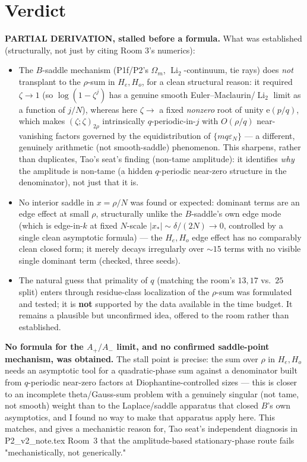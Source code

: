 \documentclass[11pt]{article}
\theoremstyle{remark}\newtheorem{remark}[theorem]{Remark}
\newcommand{\e}{\mathrm{e}}
\begin{document}
\section{Verdict}
\textbf{PARTIAL DERIVATION, stalled before a formula.} What was established (structurally, not just by citing Room 3's numerics):
\begin{itemize}
\item The $B$-saddle mechanism (P1f/P2's $\Omega_m$, $\operatorname{Li}_2$-continuum, tie rays) does \emph{not} transplant to the
$\rho$-sum in $H_e,H_o$, for a clean structural reason: it required $\zeta\to1$ (so $\log(1-\zeta^j)$ has a genuine smooth
Euler--Maclaurin/$\operatorname{Li}_2$ limit as a function of $j/N$), whereas here $\zeta\to$ a fixed \emph{nonzero} root of unity
$\e(p/q)$, which makes $(\zeta;\zeta)_{2\rho}$ intrinsically $q$-periodic-in-$j$ with $O(\rho/q)$ near-vanishing factors governed
by the equidistribution of $\{mq\varepsilon_N\}$ — a different, genuinely arithmetic (not smooth-saddle) phenomenon. This
sharpens, rather than duplicates, Tao's seat's finding (non-tame amplitude): it identifies \emph{why} the amplitude is non-tame
(a hidden $q$-periodic near-zero structure in the denominator), not just that it is.
\item No interior saddle in $x=\rho/N$ was found or expected: dominant terms are an edge effect at small $\rho$, structurally
unlike the $B$-saddle's own edge mode (which is edge-in-$k$ at fixed $N$-scale $|x_*|\sim\delta/(2N)\to0$, controlled by a single
clean asymptotic formula) — the $H_e,H_o$ edge effect has no comparably clean closed form; it merely decays irregularly over
$\sim15$ terms with no visible single dominant term (checked, three seeds).
\item The natural guess that primality of $q$ (matching the room's $13,17$ vs.\ $25$ split) enters through residue-class
localization of the $\rho$-sum was formulated and tested; it is \textbf{not} supported by the data available in the time budget.
It remains a plausible but unconfirmed idea, offered to the room rather than established.
\end{itemize}
\textbf{No formula for the $A_+/A_-$ limit, and no confirmed saddle-point mechanism, was obtained.} The stall point is precise:
the sum over $\rho$ in $H_e,H_o$ needs an asymptotic tool for a quadratic-phase sum against a denominator built from
$q$-periodic near-zero factors at Diophantine-controlled sizes — this is closer to an incomplete theta/Gauss-sum problem with a
genuinely singular (not tame, not smooth) weight than to the Laplace/saddle apparatus that closed $B$'s own asymptotics, and I
found no way to make that apparatus apply here. This matches, and gives a mechanistic reason for, Tao seat's independent
diagnosis in P2\_v2\_note.tex Room~3 that the amplitude-based stationary-phase route fails "mechanistically, not generically."
\end{document}
